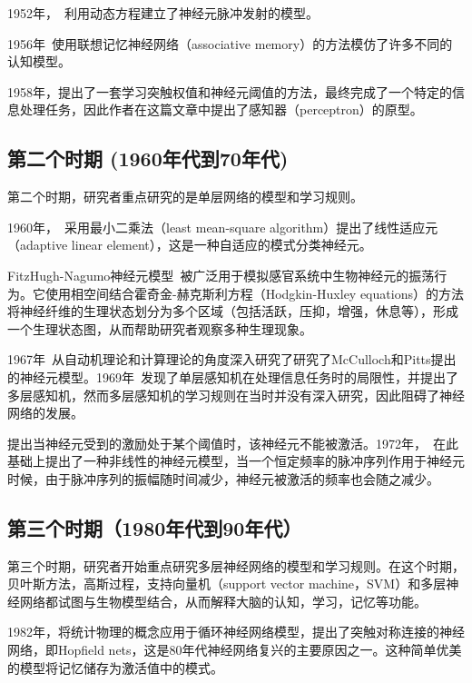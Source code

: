 1952年，~\citet{hodgkin1952quantitative}利用动态方程建立了神经元脉冲发射的模型。

1956年~\citet{taylor1956electrical}使用联想记忆神经网络（associative memory）的方法模仿了许多不同的认知模型。

1958年，\citet{rosenblatt1958perceptron}提出了一套学习突触权值和神经元阈值的方法，最终完成了一个特定的信息处理任务，因此作者在这篇文章中提出了感知器（perceptron）的原型。

\subsection{第二个时期 (1960年代到70年代)}
第二个时期，研究者重点研究的是单层网络的模型和学习规则。

1960年，~\citet{widrow1960adaptive}采用最小二乘法（least mean-square algorithm）提出了线性适应元（adaptive linear element），这是一种自适应的模式分类神经元。

FitzHugh-Nagumo神经元模型~\cite{fitzhugh1961impulses}被广泛用于模拟感官系统中生物神经元的振荡行为。它使用相空间结合霍奇金-赫克斯利方程（Hodgkin-Huxley equations）的方法将神经纤维的生理状态划分为多个区域（包括活跃，压抑，增强，休息等），形成一个生理状态图，从而帮助研究者观察多种生理现象。

1967年~\citet{minsky1967computation}从自动机理论和计算理论的角度深入研究了研究了McCulloch和Pitts提出的神经元模型。1969年~\citet{minsky5paper}发现了单层感知机在处理信息任务时的局限性，并提出了多层感知机，然而多层感知机的学习规则在当时并没有深入研究，因此阻碍了神经网络的发展。

\citet{cainiello1961outline}提出当神经元受到的激励处于某个阈值时，该神经元不能被激活。1972年，~\citet{nagumo1972response}在此基础上提出了一种非线性的神经元模型，当一个恒定频率的脉冲序列作用于神经元时候，由于脉冲序列的振幅随时间减少，神经元被激活的频率也会随之减少。

\subsection{第三个时期（1980年代到90年代）}
第三个时期，研究者开始重点研究多层神经网络的模型和学习规则。在这个时期，贝叶斯方法，高斯过程，支持向量机（support vector machine，SVM）和多层神经网络都试图与生物模型结合，从而解释大脑的认知，学习，记忆等功能。

1982年，\citet{hopfield1982neural}将统计物理的概念应用于循环神经网络模型，提出了突触对称连接的神经网络，即Hopfield nets，这是80年代神经网络复兴的主要原因之一。这种简单优美的模型将记忆储存为激活值中的模式。

